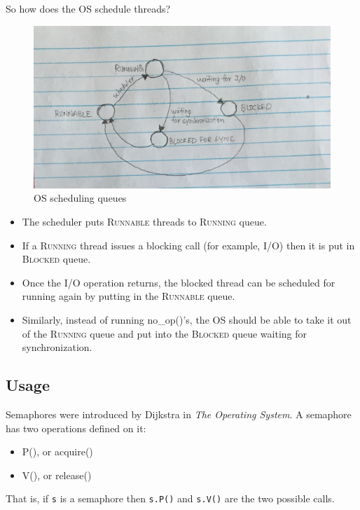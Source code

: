 \documentclass[twoside]{article}
\begin{document}
So how does the OS schedule threads?

\begin{figure}
  \includegraphics[width=\linewidth]{img/states.png}
  \caption{OS scheduling queues}
\end{figure}

\begin{itemize}
    \item The scheduler puts \textsc{Runnable} threads to \textsc{Running} queue.
    \item If a \textsc{Running} thread issues a blocking call (for example, I/O) then it is put in \textsc{Blocked} queue.
    \item Once the I/O operation returns, the blocked thread can be scheduled for running again by putting in the \textsc{Runnable} queue.
    \item Similarly, instead of running no\_op()'s, the OS should be able to take it out of the \textsc{Running} queue and put into the \textsc{Blocked} queue waiting for synchronization.
\end{itemize}

\subsection{Usage}

Semaphores were introduced by Dijkstra in {\it The Operating System}. A semaphore has two operations defined on it:

\begin{itemize}
    \item P(), or acquire()
    \item V(), or release()
\end{itemize}

That is, if {\tt s} is a semaphore then {\tt s.P()} and {\tt s.V()} are the two possible calls.
\end{document}
